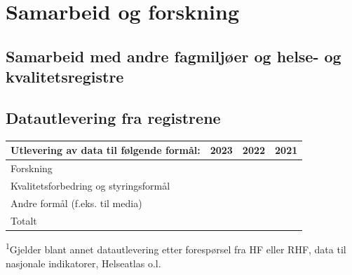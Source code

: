 \documentclass{article}
\begin{document}
    
    
    
    \section{Samarbeid og forskning}
    
    \subsection{Samarbeid med andre fagmiljøer og helse- og kvalitetsregistre}
    
    
    \subsection{Datautlevering fra registrene}
    
    
    \vspace{5mm}
    \begin{centering}
        \begin{tabularx}{\linewidth}{| X | P{2cm} | P{2cm} | P{2cm} |}
        \hline
            Utlevering av data til følgende formål: & 2023 & 2022 & 2021 \\
            \hline
            Forskning & & & \\
            \hline
            Kvalitetsforbedring og styringsformål\footnotemark & & & \\
            \hline
            Andre formål (f.eks. til media) & & & \\
            \hline
            Totalt & & & \\
            \hline
        \end{tabularx}
        \footnotesize{\textsuperscript{1}Gjelder blant annet datautlevering etter forespørsel fra HF eller RHF, data til nasjonale indikatorer, Helseatlas o.l.}
    \end{centering}
    
\end{document}
